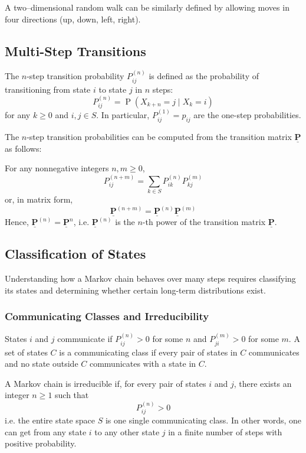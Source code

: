\documentclass[10pt, headings=standardclasses, parskip=half, twoside]{scrartcl}
\renewcommand{\emph}[1]{\textcolor{mypurple}{#1}}
\newcommand{\matr}[1]{\underline{\boldsymbol{#1}}}
\newcommand{\Prob}{\operatorname{P}}
\begin{document}
A two–dimensional random walk can be similarly defined by allowing moves in four directions (up, down, left, right).





\subsection{Multi-Step Transitions}\label{subsec:multistep_transitions}
\begin{definition}\label{def:n-step}
  The \(n\)-step transition probability \(P_{ij}^{(n)}\) is defined as the probability of transitioning from state \(i\) to state \(j\) in \(n\) steps:
  \[
  P_{ij}^{(n)}=\Prob(X_{k+n}=j\mid X_k=i)
  \]
  for any \(k\ge0\) and \(i,j\in S\).
  In particular, \(P_{ij}^{(1)}=p_{ij}\) are the one-step probabilities.
\end{definition}
The \(n\)-step transition probabilities can be computed from the transition matrix \(\matr{P}\) as follows:
\begin{theorem}\label{thm:chapman-kolmogorov}
  For any nonnegative integers \(n,m \ge 0\),
  \[
  P_{ij}^{(n+m)}=\sum_{k\in S} P_{ik}^{(n)}P_{kj}^{(m)}
  \]
  or, in matrix form,
  \[
  \matr{P}^{(n+m)}=\matr{P}^{(n)}\matr{P}^{(m)}
  \]
  Hence, \(\matr{P}^{(n)}=\matr{P}^n\), i.e. \(\matr{P}^{(n)}\) is the \(n\)-th power of the transition matrix \(\matr{P}\).
\end{theorem}




\subsection{Classification of States}\label{subsec:classification}
Understanding how a Markov chain behaves over many steps requires classifying its states and determining whether certain long-term distributions exist.
\subsubsection{Communicating Classes and Irreducibility}
\label{subsubsec:communicating_classes}
\begin{definition}[Communication]\label{def:communicating}
  States \(i\) and \(j\) \emph{communicate} if \(P_{ij}^{(n)}>0\) for some \(n\) and \(P_{ji}^{(m)}>0\) for some \(m\).
  A set of states \(C\) is a \emph{communicating class} if every pair of states in \(C\) communicates and no state outside \(C\) communicates with a state in \(C\).
\end{definition}
\begin{definition}[Irreducibility]\label{def:irreducible}
A Markov chain is \emph{irreducible} if, for every pair of states \(i\) and \(j\), there exists an integer \(n\ge1\) such that
\[
P_{ij}^{(n)}>0
\]
i.e. the entire state space \(S\) is one single communicating class. 
In other words, one can get from any state \(i\) to any other state \(j\) in a finite number of steps with positive probability.
\end{definition}
\end{document}
